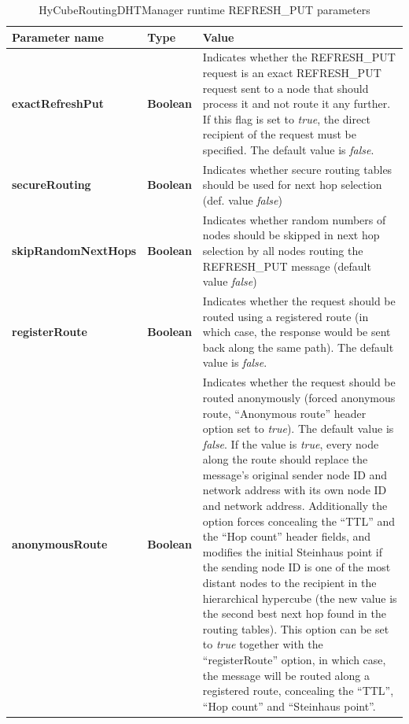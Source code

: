 \begin{table}
\scriptsize
\begin{center}
\begin{tabular}{p{2.5cm} p{1.5cm} p{10.5cm}}
	\hline
	\textbf{Parameter name}					& \textbf{Type}					& \textbf{Value}					\\[1mm]
    \hline
	\textbf{exactRefreshPut}				& \textbf{Boolean}				& Indicates whether the REFRESH\_PUT request is an exact REFRESH\_PUT request sent to a node that should process it and not route it any further. If this flag is set to \emph{true}, the direct recipient of the request must be specified. The default value is \emph{false}.			\\[1.5mm]
	\textbf{secureRouting}					& \textbf{Boolean}				& Indicates whether secure routing tables should be used for next hop selection (def. value \emph{false})			\\[1.5mm]
	\textbf{skipRandomNextHops}				& \textbf{Boolean}				& Indicates whether random numbers of nodes should be skipped in next hop selection by all nodes routing the REFRESH\_PUT message (default value \emph{false})		\\[1.5mm]
	\textbf{registerRoute}					& \textbf{Boolean}				& Indicates whether the request should be routed using a registered route (in which case, the response would be sent back along the same path). The default value is \emph{false}.		\\[1.5mm]
	\textbf{anonymousRoute}					& \textbf{Boolean}				& Indicates whether the request should be routed anonymously (forced anonymous route, ``Anonymous route'' header option set to \emph{true}). The default value is \emph{false}. If the value is \emph{true}, every node along the route should replace the message's original sender node ID and network address with its own node ID and network address. Additionally the option forces concealing the ``TTL'' and the ``Hop count'' header fields, and modifies the initial Steinhaus point if the sending node ID is one of the most distant nodes to the recipient in the hierarchical hypercube (the new value is the second best next hop found in the routing tables). This option can be set to \emph{true} together with the ``registerRoute'' option, in which case, the message will be routed along a registered route, concealing the ``TTL'', ``Hop count'' and ``Steinhaus point''.		\\[1.5mm]
    \hline
\end{tabular}
\end{center}
\caption{HyCubeRoutingDHTManager runtime REFRESH\_PUT parameters}
\label{tab:HyCubeRoutingDHTManagerRefreshPutParameters}
\end{table}

